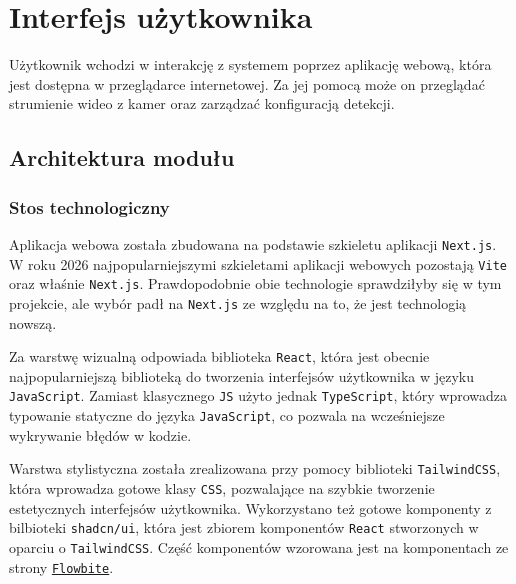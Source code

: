\chapter{Interfejs użytkownika}
Użytkownik wchodzi w interakcję z systemem poprzez aplikację webową, która jest dostępna w przeglądarce internetowej.
Za jej pomocą może on przeglądać strumienie wideo z kamer oraz zarządzać konfiguracją detekcji.

\section{Architektura modułu}
\subsection{Stos technologiczny}
Aplikacja webowa została zbudowana na podstawie szkieletu aplikacji \texttt{Next.js}. 
W roku 2026 najpopularniejszymi szkieletami aplikacji webowych pozostają \texttt{Vite} oraz właśnie \texttt{Next.js}.
Prawdopodobnie obie technologie sprawdziłyby się w tym projekcie, ale wybór padł na \texttt{Next.js} ze względu na to, że jest technologią nowszą.

Za warstwę wizualną odpowiada biblioteka \texttt{React}, która jest obecnie najpopularniejszą biblioteką do tworzenia interfejsów użytkownika w języku \texttt{JavaScript}. Zamiast klasycznego \texttt{JS} użyto jednak \texttt{TypeScript}, który wprowadza typowanie statyczne do języka \texttt{JavaScript}, co pozwala na wcześniejsze wykrywanie błędów w kodzie.

Warstwa stylistyczna została zrealizowana przy pomocy biblioteki \texttt{TailwindCSS}, która wprowadza gotowe klasy \texttt{CSS}, pozwalające na szybkie tworzenie estetycznych interfejsów użytkownika. Wykorzystano też gotowe komponenty z bilbioteki \texttt{shadcn/ui}, która jest zbiorem komponentów \texttt{React} stworzonych w oparciu o \texttt{TailwindCSS}. Część komponentów wzorowana jest na komponentach ze strony \href{https://flowbite.com}{\texttt{Flowbite}}.

